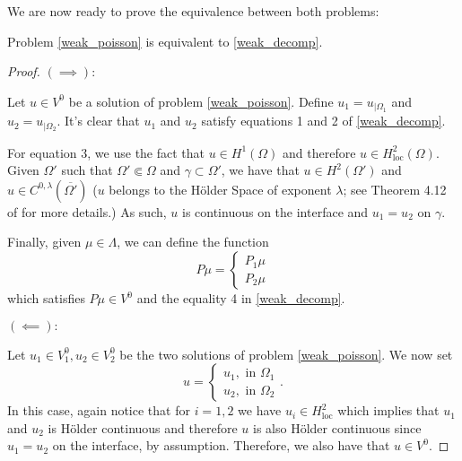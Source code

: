 We are now ready to prove the equivalence between both problems:
\begin{theorem}\label{equivalence_transmission}
    Problem \eqref{weak_poisson} is equivalent to \eqref{weak_decomp}.
\end{theorem}
\begin{proof}
    \((\implies):\)

    Let \(u \in V^0\) be a solution of problem \eqref{weak_poisson}. Define \(u_1 = u_{|\Omega_1}\) and \(u_2 = u_{|\Omega_2}\). It's clear that \(u_1\) and \(u_2\) satisfy equations 1 and 2 of \eqref{weak_decomp}. 
    
    For equation 3, we use the fact that \(u \in H^1(\Omega)\) and therefore \(u \in H^2_{\text{loc}}(\Omega)\). Given \(\Omega'\) such that \(\Omega' \Subset \Omega\) and \(\gamma \subset \Omega'\), we have that \(u \in H^2(\Omega')\) and \(u \in C^{0,\lambda}(\overline{\Omega'})\) (\(u\) belongs to the H\"{o}lder Space of exponent \(\lambda\); see Theorem 4.12 of \cite{adams2003sobolev} for more details.) As such, \(u\) is continuous on the interface and \(u_1=u_2\) on \(\gamma\).

    Finally, given \(\mu \in \Lambda\), we can define the function
    \[
        P \mu =
    \begin{cases}
        P_1 \mu\\
        P_2 \mu
    \end{cases}
    \]
    which satisfies \(P \mu \in V^0\) and the equality 4 in \eqref{weak_decomp}.

    \vspace*{0.5cm}
    \((\impliedby):\)

    Let \(u_1 \in V_1^0, u_2 \in V_2^0\) be the two solutions of problem \eqref{weak_poisson}. We now set
    \[
    u=\begin{cases}
        u_1, \text{ in } \Omega_1\\
        u_2, \text{ in } \Omega_2
    \end{cases}.
    \]
    In this case, again notice that for \(i=1, 2\) we have \(u_i \in H^2_{\text{loc}}\) which implies that \(u_1\) and \(u_2\) is H\"{o}lder continuous and therefore \(u\) is also H\"{o}lder continuous since \(u_1 = u_2\) on the interface, by assumption. Therefore, we also have that \(u \in V^0\). 
    

\end{proof}
